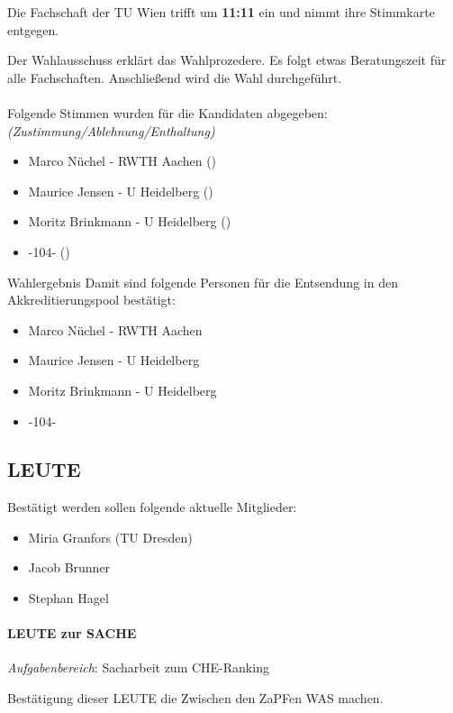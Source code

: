     \begin{info}{}
      Die Fachschaft der TU Wien trifft um \textbf{11:11} ein und nimmt ihre Stimmkarte entgegen.
    \end{info}

    Der Wahlausschuss erklärt das Wahlprozedere.
    Es folgt etwas Beratungszeit für alle Fachschaften. Anschließend wird die Wahl durchgeführt. \\ \\

    Folgende Stimmen wurden für die Kandidaten abgegeben: \textit{(Zustimmung/Ablehnung/Enthaltung)}
    \begin{itemize}
      \item Marco Nüchel - RWTH Aachen ()
      \item Maurice Jensen - U Heidelberg ()
      \item Moritz Brinkmann - U Heidelberg ()
      \item -104- ()
    \end{itemize}

    \begin{success}{Wahlergebnis}
      Damit sind folgende Personen für die Entsendung in den Akkreditierungspool bestätigt:
      \begin{itemize}
        \item Marco Nüchel - RWTH Aachen
        \item Maurice Jensen - U Heidelberg
        \item Moritz Brinkmann - U Heidelberg
        \item -104-
      \end{itemize}
    \end{success}

  \subsection{LEUTE}
      Bestätigt werden sollen folgende aktuelle Mitglieder:
      \begin{itemize}
        \item Miria Granfors (TU Dresden)
        \item Jacob Brunner
        \item Stephan Hagel
      \end{itemize}
    \paragraph{LEUTE zur SACHE}
      \textit{Aufgabenbereich}: Sacharbeit zum CHE-Ranking
      \begin{success}
        Bestätigung dieser LEUTE die Zwischen den ZaPFen WAS machen.
      \end{success}

